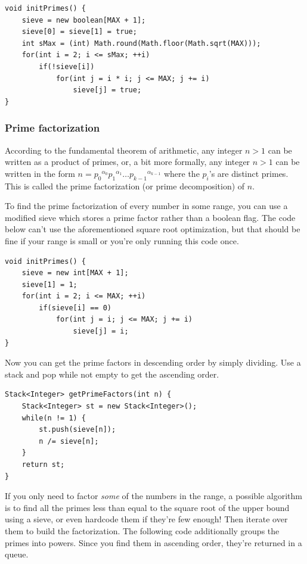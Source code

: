 \documentclass[a4paper,12pt]{article}
\begin{document}
\begin{lstlisting}
void initPrimes() {
	sieve = new boolean[MAX + 1];
	sieve[0] = sieve[1] = true;
	int sMax = (int) Math.round(Math.floor(Math.sqrt(MAX)));
	for(int i = 2; i <= sMax; ++i)
		if(!sieve[i])
			for(int j = i * i; j <= MAX; j += i)
				sieve[j] = true;
}
\end{lstlisting}

\subsubsection{Prime factorization}

According to the fundamental theorem of arithmetic, any integer $n>1$ can be written as a product of primes, or, a bit more formally, any integer $n>1$ can be written in the form $n={p_0}^{\alpha_0}{p_1}^{\alpha_1}\ldots{p_{k-1}}^{\alpha_{k-1}}$ where the $p_i$'s are distinct primes. This is called the prime factorization (or prime decomposition) of $n$.

To find the prime factorization of every number in some range, you can use a modified sieve which stores a prime factor rather than a boolean flag. The code below can't use the aforementioned square root optimization, but that should be fine if your range is small or you're only running this code once.

\begin{lstlisting}
void initPrimes() {
	sieve = new int[MAX + 1];
	sieve[1] = 1;
	for(int i = 2; i <= MAX; ++i)
		if(sieve[i] == 0)
			for(int j = i; j <= MAX; j += i)
				sieve[j] = i;
}
\end{lstlisting}

\noindent Now you can get the prime factors in descending order by simply dividing. Use a stack and pop while not empty to get the ascending order.

\begin{lstlisting}
Stack<Integer> getPrimeFactors(int n) {
	Stack<Integer> st = new Stack<Integer>();
	while(n != 1) {
		st.push(sieve[n]);
		n /= sieve[n];
	}
	return st;
}
\end{lstlisting}

\noindent If you only need to factor {\em some} of the numbers in the range, a possible algorithm is to find all the primes less than equal to the square root of the upper bound using a sieve, or even hardcode them if they're few enough! Then iterate over them to build the factorization. The following code additionally groups the primes into powers. Since you find them in ascending order, they're returned in a queue.
\end{document}
